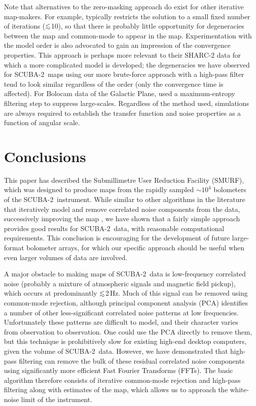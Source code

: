 \documentclass[useAMS,usenatbib,nofootinbib]{mn2e}
\newcommand{\scuba}{SCUBA-2}
\def\lsim{\mathrel{\lower2.5pt\vbox{\lineskip=0pt\baselineskip=0pt
          \hbox{$<$}\hbox{$\sim$}}}}
\begin{document}
Note that alternatives to the zero-masking approach do exist for other
iterative map-makers. For example, \citet{kovacs2008} typically
restricts the solution to a small fixed number of iterations
($\lsim$10), so that there is probably little opportunity for
degeneracies between the map and common-mode to appear in the map.
Experimentation with the model order is also advocated to gain an
impression of the convergence properties. This approach is perhaps
more relevant to their SHARC-2 data for which a more complicated model
is developed; the degeneracies we have observed for \scuba\ maps using
our more brute-force approach with a high-pass filter tend to look
similar regardless of the order (only the convergence time is
affected).  For Bolocam data of the Galactic Plane,
\citet{aguirre2011} used a maximum-entropy filtering step to suppress
large-scales. Regardless of the method used, simulations are always
required to establish the transfer function and noise properties as a
function of angular scale.


\section{Conclusions}
\label{sec:conclusions}

This paper has described the Submillimetre User Reduction Facility
(SMURF), which was designed to produce maps from the rapidly sampled
$\sim10^4$ bolometers of the \scuba\ instrument. While similar to
other algorithms in the literature that iteratively model and remove
correlated noise components from the data, successively improving the
map \citep[e.g.,][]{kovacs2008,aguirre2011,schuller2012}, we have
shown that a fairly simple approach provides good results for \scuba\
data, with reasonable computational requirements. This conclusion is
encouraging for the development of future large-format bolometer
arrays, for which our specific approach should be useful when even
larger volumes of data are involved.

A major obstacle to making maps of \scuba\ data is low-frequency
correlated noise (probably a mixture of atmospheric signals and
magnetic field pickup), which occurs at predominantly $\lsim$2\,Hz.
Much of this signal can be removed using common-mode rejection,
although principal component analysis (PCA) identifies a number of
other less-significant correlated noise patterns at low
frequencies. Unfortunately these patterns are difficult to model, and
their character varies from observation to observation. One could use
the PCA directly to remove them, but this technique is prohibitively
slow for existing high-end desktop computers, given the volume of
\scuba\ data. However, we have demonstrated that high-pass filtering
can remove the bulk of these residual correlated noise components
using significantly more efficient Fast Fourier Transforms (FFTs). The
basic algorithm therefore consists of iterative common-mode rejection
and high-pass filtering along with estimates of the map, which allows
us to approach the white-noise limit of the instrument.
\end{document}
